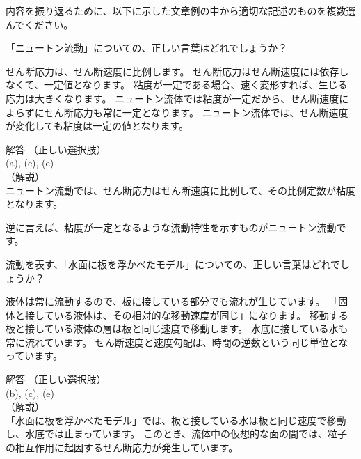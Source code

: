 \documentclass[uplatex,dvipdfmx,a4paper,11pt]{jsarticle}
\begin{document}
内容を振り返るために、以下に示した文章例の中から適切な記述のものを複数選んでください。
\begin{qlist}
	\qitem 「ニュートン流動」についての、正しい言葉はどれでしょうか？
		\begin{qlist2}
			\qitem せん断応力は、せん断速度に比例します。
			\qitem せん断応力はせん断速度には依存しなくて、一定値となります。
			\qitem 粘度が一定である場合、速く変形すれば、生じる応力は大きくなります。
			\qitem ニュートン流体では粘度が一定だから、せん断速度によらずにせん断応力も常に一定となります。
			\qitem ニュートン流体では、せん断速度が変化しても粘度は一定の値となります。
		\end{qlist2}
		\vspace{3mm}
        \begin{itembox}[l]{解答}
            （正しい選択肢）\\
            (a), (c), (e)\\
            （解説）\\
            ニュートン流動では、せん断応力はせん断速度に比例して、その比例定数が粘度となります。
			
			逆に言えば、粘度が一定となるような流動特性を示すものがニュートン流動です。
        \end{itembox}
	\qitem 流動を表す、「水面に板を浮かべたモデル」についての、正しい言葉はどれでしょうか？
		\begin{qlist2}
			\qitem 液体は常に流動するので、板に接している部分でも流れが生じています。
			\qitem 「固体と接している液体は、その相対的な移動速度が同じ」になります。
			\qitem 移動する板と接している液体の層は板と同じ速度で移動します。
			\qitem 水底に接している水も常に流れています。
			\qitem せん断速度と速度勾配は、時間の逆数という同じ単位となっています。
		\end{qlist2}
		\vspace{3mm}
        \begin{itembox}[l]{解答}
            （正しい選択肢）\\
            (b), (c), (e)\\
            （解説）\\
            「水面に板を浮かべたモデル」では、板と接している水は板と同じ速度で移動し、水底では止まっています。
            このとき、流体中の仮想的な面の間では、粒子の相互作用に起因するせん断応力が発生しています。


\end{itembox}
\end{qlist}
\end{document}
